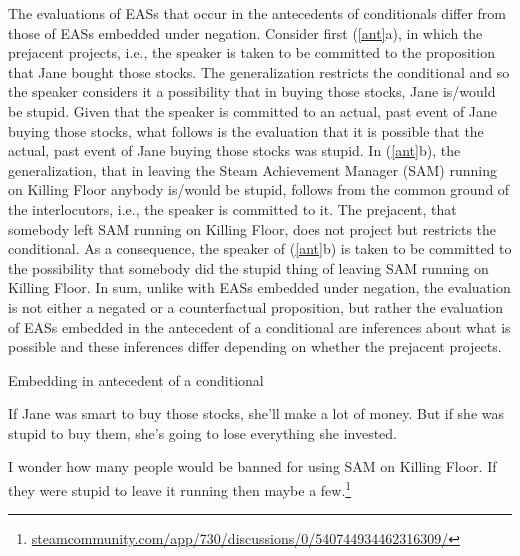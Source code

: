 \documentclass[11pt,fleqn]{article}
\newcommand{\6}{\mbox{$[\hspace*{-.6mm}[$}}
\newcommand{\9}{\mbox{$]\hspace*{-.6mm}]$}}
\begin{document}
The evaluations of EASs that occur in the antecedents of conditionals differ from those of EASs embedded under negation. Consider first (\ref{ant}a), in which the prejacent projects, i.e., the speaker is taken to be committed to the proposition that Jane bought those stocks. The generalization restricts the conditional and so the speaker considers it a possibility that in buying those stocks, Jane is/would be stupid. Given that the speaker is committed to an actual, past event of Jane buying those stocks, what follows is the evaluation that it is possible that the actual, past event of Jane buying those stocks was stupid. In (\ref{ant}b), the generalization, that in leaving the Steam Achievement Manager (SAM) running on Killing Floor anybody is/would be stupid, follows from the common ground of the interlocutors, i.e., the speaker is committed to it. The prejacent, that somebody left SAM running on Killing Floor, does not project but restricts the conditional. As a consequence, the speaker of (\ref{ant}b) is taken to be committed to the possibility that somebody did the stupid thing of leaving SAM running on Killing Floor. In sum, unlike with EASs embedded under negation, the evaluation is not either a negated or a counterfactual proposition, but rather the evaluation of EASs embedded in the antecedent of a conditional are inferences about what is possible and these inferences differ depending on whether the prejacent projects.

\begin{exe}
\ex\label{ant} Embedding in antecedent of a conditional
\begin{xlist}

\ex If Jane was smart to buy those stocks, she'll make a lot of money. But if she was stupid to buy them, she's going to lose everything she invested.



\ex 
\begin{xlist}
 I wonder how many people would be banned for using SAM on Killing Floor.
 If they were stupid to leave it running then maybe a few.\footnote{\url{steamcommunity.com/app/730/discussions/0/540744934462316309/}}

\end{xlist} 
\end{xlist}
\end{exe}
\end{document}
